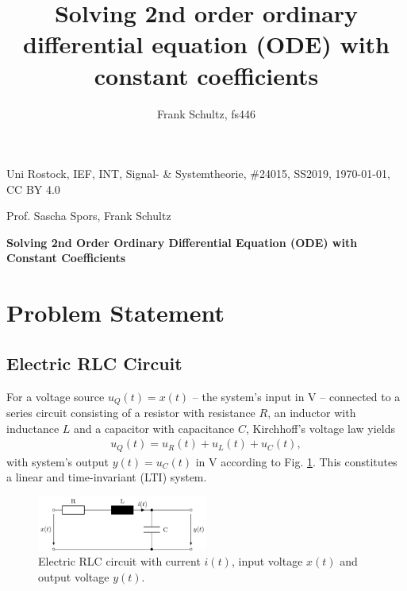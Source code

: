 \documentclass[a4paper,11pt,oneside]{scrartcl}
\title{Solving 2nd order ordinary differential equation (ODE) with constant
coefficients}
\author{Frank Schultz, fs446}
\begin{document}
%
\noindent Uni Rostock, IEF, INT, Signal- \& Systemtheorie, \#24015, SS2019,
\today, CC BY 4.0

\noindent Prof. Sascha Spors, Frank Schultz

\noindent \textbf{Solving 2nd Order Ordinary Differential Equation (ODE) with
Constant Coefficients}

\section{Problem Statement}

\subsection{Electric RLC Circuit}
For a voltage source $u_Q(t)=x(t)$ -- the system's input in V -- connected to a
series circuit consisting of
a resistor with resistance $R$,
an inductor with inductance $L$ and
a capacitor with capacitance $C$, Kirchhoff's voltage law yields
\begin{align}
\label{eq:KirchhoffLaw}
u_Q(t) = u_R(t) + u_L(t) + u_C(t),
\end{align}
with system's output $y(t) = u_C(t)$ in V according to Fig. \ref{fig:lowpass}.
This constitutes a linear and time-invariant (LTI) system.
%
\begin{figure}[h]
\centering
\includegraphics[width=0.5\textwidth]{lowpass.png}
\caption{Electric RLC circuit with current $i(t)$, input voltage $x(t)$
and output voltage $y(t)$.}
\label{fig:lowpass}
\end{figure}

\end{document}
